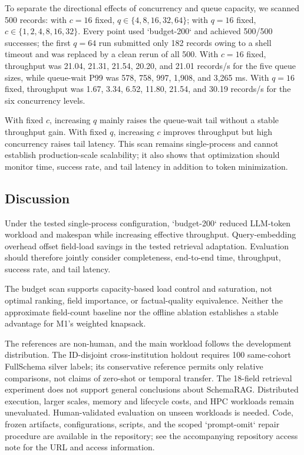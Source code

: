 \documentclass[runningheads]{llncs}
\newcommand{\schemarag}{SchemaRAG}
\begin{document}
To separate the directional effects of concurrency and queue capacity, we scanned 500 records: with $c=16$ fixed, $q\in\{4,8,16,32,64\}$; with $q=16$ fixed, $c\in\{1,2,4,8,16,32\}$. Every point used `budget-200` and achieved 500/500 successes; the first $q=64$ run submitted only 182 records owing to a shell timeout and was replaced by a clean rerun of all 500. With $c=16$ fixed, throughput was 21.04, 21.31, 21.54, 20.20, and 21.01 records/s for the five queue sizes, while queue-wait P99 was 578, 758, 997, 1,908, and 3,265 ms. With $q=16$ fixed, throughput was 1.67, 3.34, 6.52, 11.80, 21.54, and 30.19 records/s for the six concurrency levels.

With fixed $c$, increasing $q$ mainly raises the queue-wait tail without a stable throughput gain. With fixed $q$, increasing $c$ improves throughput but high concurrency raises tail latency. This scan remains single-process and cannot establish production-scale scalability; it also shows that optimization should monitor time, success rate, and tail latency in addition to token minimization.

\subsection{Discussion}

Under the tested single-process configuration, `budget-200` reduced
LLM-token workload and makespan while increasing effective throughput.
Query-embedding overhead offset field-load savings in the tested
retrieval adaptation. Evaluation should therefore jointly consider
completeness, end-to-end time, throughput, success rate, and tail latency.

The budget scan supports capacity-based load control and saturation,
not optimal ranking, field importance, or factual-quality equivalence.
Neither the approximate field-count baseline nor the offline ablation
establishes a stable advantage for M1's weighted knapsack.

The references are non-human, and the main workload follows the
development distribution. The ID-disjoint cross-institution holdout
requires 100 same-cohort FullSchema silver labels; its conservative
reference permits only relative comparisons, not claims of zero-shot
or temporal transfer. The 18-field retrieval experiment does not
support general conclusions about \schemarag{}. Distributed execution,
larger scales, memory and lifecycle costs, and HPC workloads remain
unevaluated. Human-validated evaluation on unseen workloads is needed.
Code, frozen artifacts, configurations, scripts, and the scoped
`prompt-omit` repair procedure are available in the repository;
see the accompanying repository access note for the URL and access information.
\end{document}
